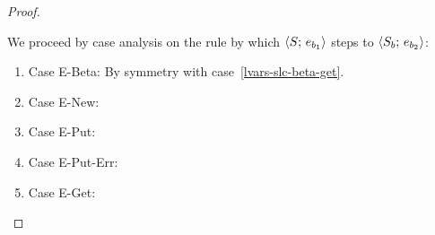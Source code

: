 \begin{proof}
\begin{enumerate}
    We proceed by case analysis on the rule by which
    $\langle S;\, e_{b_1} \rangle$ steps to $\langle S_b;\, e_{b_2} \rangle$:
    \begin{enumerate}
    \item Case {\sc E-Beta}: By symmetry with case~\ref{lvars-slc-beta-get}.
    \item Case {\sc E-New}: \TODO{}
    \item Case {\sc E-Put}: \TODO{}
    \item Case {\sc E-Put-Err}: \TODO{}
    \item Case {\sc E-Get}: \TODO{}
    \end{enumerate}
  \end{enumerate}
\end{proof}
